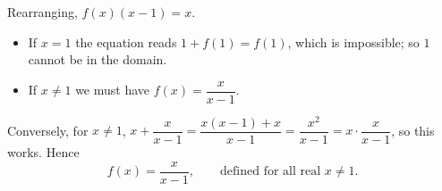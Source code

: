 Rearranging, $f(x)(x-1)=x$.
\begin{itemize}
\item If $x=1$ the equation reads $1+f(1)=f(1)$, which is impossible; so $1$ cannot be in the domain.
\item If $x\ne1$ we must have $f(x)=\dfrac{x}{x-1}$.
\end{itemize}
Conversely, for $x\ne1$, $x+\dfrac{x}{x-1}=\dfrac{x(x-1)+x}{x-1}=\dfrac{x^2}{x-1}=x\cdot\dfrac{x}{x-1}$, so this works. Hence
\[
\boxed{f(x)=\dfrac{x}{x-1}},\qquad\text{defined for all real }x\ne1 .
\]
